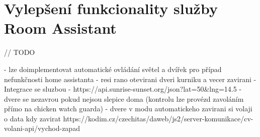 \section{Vylepšení funkcionality služby Room Assistant}\label{sec:vylepseni-funkcionality-sluzby-room-assistant}

// TODO

- lze doimplementovat automatické ovládání světel a dvířek pro případ nefunkčnosti home assistanta
- resi rano otevirani dveri kurniku a vecer zavirani
- Integrace se sluzbou  - https://api.sunrise-sunset.org/json?lat=50\&lng=14.5
- dvere se nezavrou pokud nejsou slepice doma (kontrolu lze provézd zavoláním přímo na chicken watch guarda)
- dvere v modu automatickeho zavirani si volaji o data kdy zavirat https://kodim.cz/czechitas/daweb/js2/server-komunikace/cv-volani-api/vychod-zapad